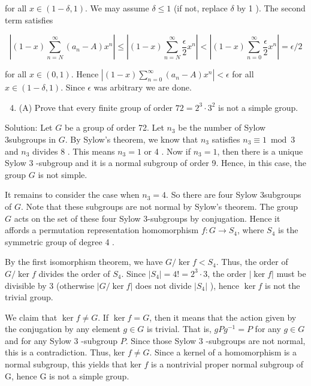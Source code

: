 \documentclass[10pt]{article}
\begin{document}
for all $x \in(1-\delta, 1)$. We may assume $\delta \leq 1$ (if not, replace $\delta$ by 1 ). The second term satisfies

$$
\left|(1-x) \sum_{n=N}^{\infty}\left(a_{n}-A\right) x^{n}\right| \leq\left|(1-x) \sum_{n=N}^{\infty} \frac{\epsilon}{2} x^{n}\right|<\left|(1-x) \sum_{n=0}^{\infty} \frac{\epsilon}{2} x^{n}\right|=\epsilon / 2
$$

for all $x \in(0,1)$. Hence $\left|(1-x) \sum_{n=0}^{\infty}\left(a_{n}-A\right) x^{n}\right|<\epsilon$ for all $x \in(1-\delta, 1)$. Since $\epsilon$ was arbitrary we are done.

\begin{enumerate}
  \setcounter{enumi}{3}
  \item (A) Prove that every finite group of order $72=2^{3} \cdot 3^{2}$ is not a simple group.
\end{enumerate}

Solution: Let $G$ be a group of order 72. Let $n_{3}$ be the number of Sylow 3subgroups in $G$. By Sylow's theorem, we know that $n_{3}$ satisfies $n_{3} \equiv 1 \bmod 3$ and $n_{3}$ divides 8 . This means $n_{3}=1$ or 4 . Now if $n_{3}=1$, then there is a unique Sylow 3 -subgroup and it is a normal subgroup of order 9. Hence, in this case, the group $G$ is not simple.

It remains to consider the case when $n_{3}=4$. So there are four Sylow 3subgroups of $G$. Note that these subgroups are not normal by Sylow's theorem. The group $G$ acts on the set of these four Sylow 3-subgroups by conjugation. Hence it affords a permutation representation homomorphism $f: G \rightarrow S_{4}$, where $S_{4}$ is the symmetric group of degree 4 .

By the first isomorphism theorem, we have $G / \operatorname{ker} f<S_{4}$. Thus, the order of $G / \operatorname{ker} f$ divides the order of $S_{4}$. Since $\left|S_{4}\right|=4 !=2^{3} \cdot 3$, the order $|\operatorname{ker} f|$ must be divisible by 3 (otherwise $|G / \operatorname{ker} f|$ does not divide $\left|S_{4}\right|$ ), hence $\operatorname{ker} f$ is not the trivial group.

We claim that $\operatorname{ker} f \neq G$. If $\operatorname{ker} f=G$, then it means that the action given by the conjugation by any element $g \in G$ is trivial. That is, $g P g^{-1}=P$ for any $g \in G$ and for any Sylow 3 -subgroup $P$. Since those Sylow 3 -subgroups are not normal, this is a contradiction. Thus, ker $f \neq G$. Since a kernel of a homomorphism is a normal subgroup, this yields that ker $f$ is a nontrivial proper normal subgroup of $\mathrm{G}$, hence $\mathrm{G}$ is not a simple group.
\end{document}
